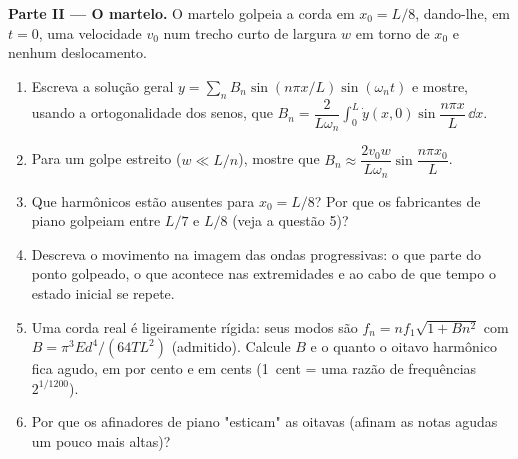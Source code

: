 \begin{problem}
\medskip
\noindent\textbf{Parte II --- O martelo.}
O martelo golpeia a corda em $x_0 = L/8$, dando-lhe, em $t = 0$, uma
velocidade $v_0$ num trecho curto de largura $w$ em torno de $x_0$ e nenhum
deslocamento.
\begin{enumerate}[resume]
  \item Escreva a solução geral $y = \sum_nB_n\sin(n\pi x/L)\sin(\omega_nt)$
        e mostre, usando a ortogonalidade dos senos, que $B_n =
        \dfrac{2}{L\omega_n}\int_0^L\dot y(x, 0)\sin\dfrac{n\pi x}L\,\dd x$.
  \item Para um golpe estreito ($w \ll L/n$), mostre que $B_n \approx \dfrac{2v_0w}
        {L\omega_n}\sin\dfrac{n\pi x_0}{L}$.
  \item Que harmônicos estão ausentes para $x_0 = L/8$? Por que os
        fabricantes de piano golpeiam entre $L/7$ e $L/8$ (veja a questão 5)?
  \item Descreva o movimento na imagem das ondas progressivas: o que
        parte do ponto golpeado, o que acontece nas extremidades e ao cabo
        de que tempo o estado inicial se repete.
  \item Uma corda real é ligeiramente rígida: seus modos são $f_n = nf_1
        \sqrt{1 + Bn^2}$ com $B = \pi^3Ed^4/(64TL^2)$ (admitido). Calcule
        $B$ e o quanto o oitavo harmônico fica agudo, em por cento e
        em cents (\qty{1}{cent} = uma razão de frequências $2^{1/1200}$).
  \item Por que os afinadores de piano "esticam" as oitavas (afinam as notas agudas
        um pouco mais altas)?
\end{enumerate}


\end{problem}
